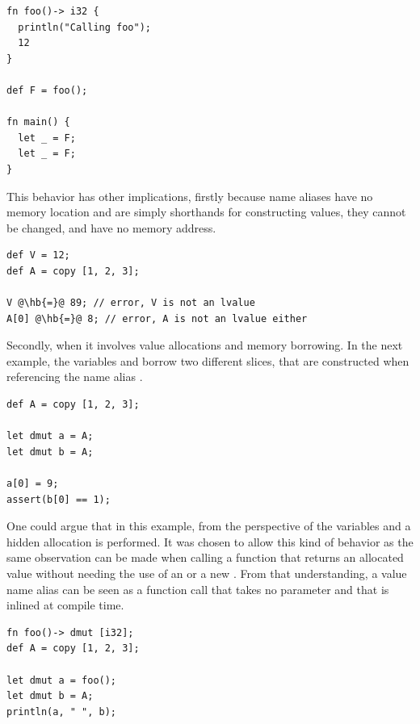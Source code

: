 \begin{lstlisting}[style=coloredverbatim]
fn foo()-> i32 {
  println("Calling foo");
  12
}

def F = foo();

fn main() {
  let _ = F;
  let _ = F;
}
\end{lstlisting}


This behavior has other implications, firstly because name aliases have no
memory location and are simply shorthands for constructing values, they cannot
be changed, and have no memory address.

\begin{lstlisting}[style=coloredverbatimError, escapechar=@]
def V = 12;
def A = copy [1, 2, 3];

V @\hb{=}@ 89; // error, V is not an lvalue
A[0] @\hb{=}@ 8; // error, A is not an lvalue either
\end{lstlisting}

Secondly, when it involves value allocations and memory borrowing. In the next
example, the variables  and  borrow two different slices, that
are constructed when referencing the name alias .

\begin{lstlisting}[style=coloredverbatim]
def A = copy [1, 2, 3];

let dmut a = A;
let dmut b = A;

a[0] = 9;
assert(b[0] == 1);
\end{lstlisting}

One could argue that in this example, from the perspective of the variables
 and  a hidden allocation is performed. It was chosen to
allow this kind of behavior as the same observation can be made when calling a
function that returns an allocated value without needing the use of an
 or a new . From that understanding, a value name
alias can be seen as a function call that takes no parameter and that is inlined
at compile time.

\begin{lstlisting}[style=coloredverbatim]
fn foo()-> dmut [i32];
def A = copy [1, 2, 3];

let dmut a = foo();
let dmut b = A;
println(a, " ", b);
\end{lstlisting}

\vfill%
\pagebreak
